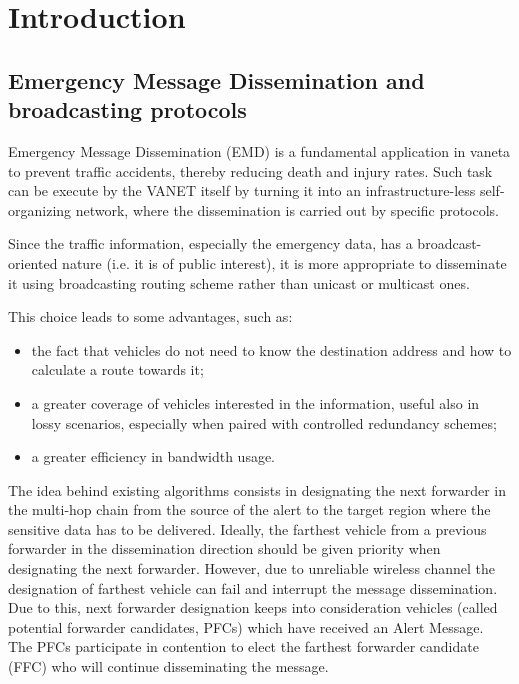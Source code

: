 
\chapter{Introduction}

	\section{Emergency Message Dissemination and broadcasting protocols}
		\label{sec:emd}
		Emergency Message Dissemination (EMD) is a fundamental application in \acrshort{vaneta} to prevent traffic accidents, thereby reducing death and injury rates. Such task can be execute by the VANET itself by turning it into an infrastructure-less self-organizing network, where the dissemination is carried out by specific protocols. 
		
		
		Since the traffic information, especially the emergency data, has a broadcast-oriented nature (i.e. it is of public interest), it is more appropriate to disseminate it using broadcasting routing scheme rather than unicast or multicast ones. \cite{5989903}
		
		This choice leads to some advantages, such as:
		\begin{itemize}
			\item the fact that vehicles do not need to know the destination address and how to calculate a route towards it;
			\item a greater coverage of vehicles interested in the information, useful also in lossy scenarios, especially when paired with controlled redundancy schemes;
			\item a greater efficiency in bandwidth usage.
		\end{itemize}
		
		The idea behind existing algorithms consists in designating the next forwarder in the multi-hop chain from the source of the alert to the target region where the sensitive data has to be delivered. Ideally, the farthest vehicle from a previous forwarder in the dissemination direction should be given priority when designating the next forwarder. However, due to unreliable wireless channel the designation of farthest vehicle can fail and interrupt the message dissemination. Due to this, next forwarder designation keeps into consideration vehicles (called potential forwarder candidates, PFCs) which have received an Alert Message. The PFCs participate in contention to elect the farthest forwarder candidate (FFC) who will continue disseminating the message.
		

